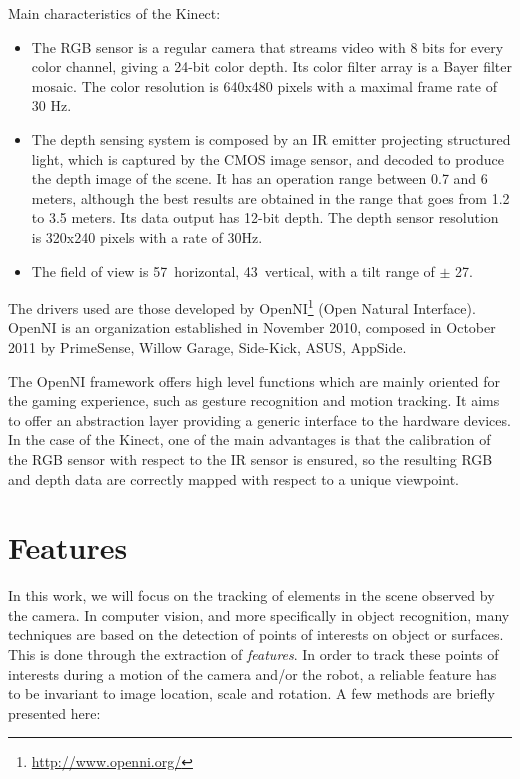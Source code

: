 Main characteristics of the Kinect:
\begin{itemize}
 \item The RGB sensor is a regular camera that streams video with 8 bits for every color channel, giving a 24-bit color depth. Its  color filter array is a Bayer filter mosaic. The color resolution is 640x480 pixels with a maximal frame rate of 30 Hz.
 \item The depth sensing system is composed by an IR emitter projecting structured light, which is captured by the CMOS image sensor, and decoded to produce the depth image of the scene. It has an operation range between 0.7 and 6 meters, although the best results are obtained in the range that goes from 1.2 to 3.5 meters. Its data output has 12-bit depth. The depth sensor resolution is 320x240 pixels with a rate of 30Hz.
 \item The field of view is 57\textdegree ~horizontal, 43\textdegree ~vertical, with a tilt range of $\pm$ 27\textdegree.
\end{itemize}

The drivers used are those developed by OpenNI\footnote{\url{http://www.openni.org/}} (Open Natural Interface). OpenNI is an organization established in November 2010, composed in October 2011 by PrimeSense, Willow Garage, Side-Kick, ASUS, AppSide.

The OpenNI framework offers high level functions which are mainly oriented for the gaming experience, such as gesture recognition and motion tracking. It aims to offer an abstraction layer providing a generic interface to the hardware devices. In the case of the Kinect, one of the main advantages is that the calibration of the RGB sensor with respect to the IR sensor is ensured, so the resulting RGB and depth data are correctly mapped with respect to a unique viewpoint.


\section{Features}

In this work, we will focus on the tracking of elements in the scene observed by the camera. In computer vision, and more specifically in object recognition, many techniques are based on the detection of points of interests on object or surfaces. This is done through the extraction of \emph{features}. In order to track these points of interests during a motion of the camera and/or the robot, a reliable feature has to be invariant to image location, scale and rotation. A few methods are briefly presented here:

